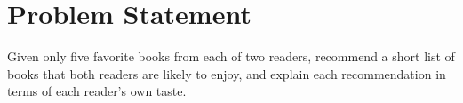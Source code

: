 \section*{Problem Statement}
Given only five favorite books from each of two readers, recommend a short list of books that both readers are likely to enjoy, and explain each recommendation in terms of each reader's own taste.
